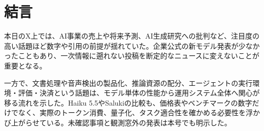 \section*{結言}
本日のX上では、AI事業の売上や将来予測、AI生成研究への批判など、注目度の高い話題ほど数字や引用の前提が揺れていた。企業公式の新モデル発表が少なかったこともあり、一次情報に遡れない投稿を断定的なニュースに変えないことが重要となる。

一方で、文書処理や音声検出の製品化、推論資源の配分、エージェントの実行環境・評価・決済という話題は、モデル単体の性能から運用システム全体へ関心が移る流れを示した。Haiku 5.5やSalukiの比較も、価格表やベンチマークの数字だけでなく、実際のトークン消費、量子化、タスク適合性を確かめる必要性を浮かび上がらせている。未確認事項と観測窓外の発表は本号でも明示した。
